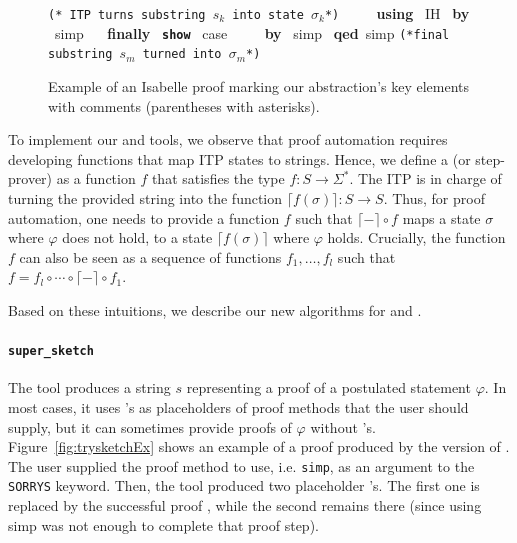 \documentclass[10pt,conference]{IEEEtran}
\newcommand{\isakwprf}[1]{\textcolor{IsaLightBlue}{\textbf{\texttt{#1}}}}
\newcommand{\isacmt}[1]{\textcolor{IsaDarkRed}{\texttt{#1}}}
\newcommand{\isakw}[1]{{\bfseries\ttfamily\def\isachardot{.}\def\isacharunderscore{\isacharunderscorekeyword}%
\def\isacharbraceleft{\{}\def\isacharbraceright{\}}#1}}
\renewcommand{\isacommand}[1]{\textcolor{IsaBlue}{\isakw{#1}}}
\begin{document}
\begin{figure}
\begin{isabellebody}
\isacmt{(* ITP turns substring $s_k$ into state $\sigma_{k}$*)}
\isanewline
\ \ \ \ \isacommand{using}\isamarkupfalse%
\ IH\ \isacommand{by}\isamarkupfalse%
\ simp\isanewline
\ \ \isacommand{finally}\isamarkupfalse%
\ \isakwprf{show}\isamarkupfalse%
\ {\isacharquery}{\kern0pt}case\isanewline
\ \ \ \ \isacommand{by}\isamarkupfalse%
\ simp\ \isanewline
\isacommand{qed}\ simp 
\isanewline \isacmt{(*final substring $s_m$ turned into $\sigma_{m}$*)}\isamarkupfalse%
\end{isabellebody}
\caption{Example of an Isabelle proof marking our abstraction's key elements with comments (parentheses with asterisks).}
\label{fig:isaproof}
\end{figure}

To implement our \supersketch{} and \superfix{} tools, we observe that proof automation requires developing functions that map ITP states to strings. Hence, we define a \emph{\frameterm} (or step-prover)  as a function $f$ that satisfies the type $f: S\to \Sigma^*$. The ITP is in charge of turning the provided string into the function $\lceil f(\sigma)\rceil: S\to S$. Thus, for proof automation, one needs to provide a \frameterm function $f$ such that $\lceil -\rceil \circ f$ maps a state $\sigma$ where $\varphi$ does not hold, to a state $\lceil f(\sigma)\rceil$ where $\varphi$ holds. Crucially, the function $f$ can also be seen as a sequence of \frameterm functions $f_1,\dots,f_l$ such that $f =f_l\circ\cdots\circ\lceil -\rceil \circ f_1$.

Based on these intuitions, we describe our new algorithms for \supersketch{} and \superfix{}.

\paragraph{\textbf{\texttt{super\_sketch}}} The \supersketch{} tool produces a string $s$ representing a proof of a postulated statement $\varphi$. In most cases, it uses \isa{\isacommand{sorry}}'s as placeholders of proof methods that the user should supply, but it can sometimes provide proofs of $\varphi$ without \isa{\isacommand{sorry}}'s. Figure~\ref{fig:trysketchEx} shows an example of a proof produced by the \trysketch{} version of \supersketch{}. The user supplied the proof method to use, i.e. \texttt{simp}, as an argument to the \texttt{SORRYS} keyword. Then, the tool produced two placeholder \isa{\isacommand{sorry}}'s. The first one is replaced by the successful proof \isa{\isacommand{by} simp}, while the second \isa{\isacommand{sorry}} remains there (since using simp was not enough to complete that proof step).
\end{document}
